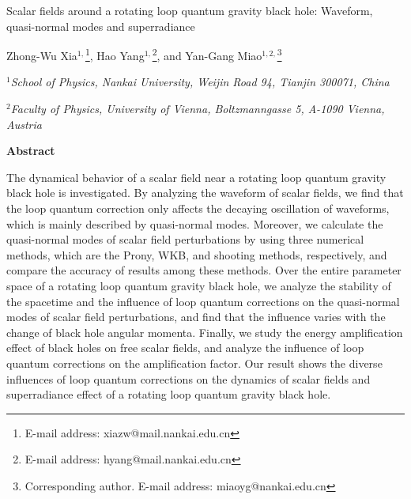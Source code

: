 \documentclass[12pt]{article}
\begin{document}
\renewcommand{\thefootnote}{\fnsymbol{footnote}}
\baselineskip=16pt
\vspace{1.0cm}
\begin{center}
{\Large\sf Scalar fields around a rotating loop quantum gravity black hole: Waveform, quasi-normal modes and superradiance}
\\[10pt]
\vspace{.5 cm}
{{Zhong-Wu Xia${}^{1,}$\footnote{E-mail address: xiazw@mail.nankai.edu.cn}}, 
{Hao Yang${}^{1,}$\footnote{E-mail address: hyang@mail.nankai.edu.cn}},
and
{Yan-Gang Miao${}^{1,2,}$\footnote{Corresponding author. E-mail address: miaoyg@nankai.edu.cn}}
	
	\vspace{6mm}
	${}^{1}${\normalsize \em School of Physics, Nankai University, Weijin Road 94, Tianjin 300071, China}
	
	\vspace{3mm}
	${}^{2}${\normalsize \em Faculty of Physics, University of Vienna, Boltzmanngasse 5, A-1090 Vienna, Austria}
}


\vspace{4.0ex}
\end{center}
\begin{center}
{\bf Abstract}
\end{center}

The dynamical behavior of a scalar field near a rotating loop quantum gravity black hole is investigated.
By analyzing the waveform of scalar fields, we find that the loop quantum correction only affects the decaying oscillation of waveforms, which is mainly described by quasi-normal modes.
Moreover, we calculate the quasi-normal modes of scalar field perturbations by using three numerical methods, which are the Prony, WKB, and shooting methods, respectively, and compare the accuracy of results among these methods.
Over the entire parameter space of a rotating loop quantum gravity black hole, we analyze the stability of the spacetime and the influence of loop quantum corrections on the quasi-normal modes of scalar field perturbations, and find that the influence varies with the change of  black hole angular momenta.
Finally, we study the energy amplification effect of black holes on free scalar fields, and analyze the influence of loop quantum corrections on the amplification factor.
Our result shows the diverse influences of loop quantum corrections on the dynamics of scalar fields and superradiance effect of a rotating loop quantum gravity black hole.
\end{document}
